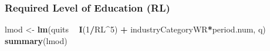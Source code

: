 \documentclass[
]{article}
\newenvironment{Shaded}{\begin{snugshade}}{\end{snugshade}}
\newcommand{\DecValTok}[1]{\textcolor[rgb]{0.00,0.00,0.81}{#1}}
\newcommand{\KeywordTok}[1]{\textcolor[rgb]{0.13,0.29,0.53}{\textbf{#1}}}
\newcommand{\NormalTok}[1]{#1}
\newcommand{\OperatorTok}[1]{\textcolor[rgb]{0.81,0.36,0.00}{\textbf{#1}}}
\newcommand{\StringTok}[1]{\textcolor[rgb]{0.31,0.60,0.02}{#1}}
\begin{document}
\hypertarget{required-level-of-education-rl-2}{%
\subsubsection{Required Level of Education
(RL)}\label{required-level-of-education-rl-2}}

\begin{Shaded}
\begin{Highlighting}[]
\NormalTok{lmod <-}\StringTok{ }\KeywordTok{lm}\NormalTok{(quits }\OperatorTok{~}\StringTok{ }\KeywordTok{I}\NormalTok{(}\DecValTok{1}\OperatorTok{/}\NormalTok{RL}\OperatorTok{^}\DecValTok{5}\NormalTok{) }\OperatorTok{+}\StringTok{ }\NormalTok{industryCategoryWR}\OperatorTok{*}\NormalTok{period.num, q)}
\KeywordTok{summary}\NormalTok{(lmod)}
\end{Highlighting}
\end{Shaded}
\end{document}
